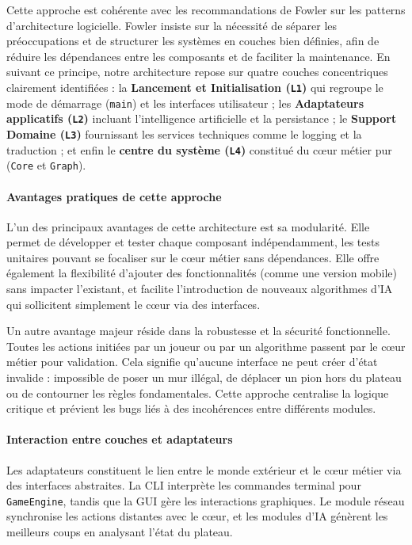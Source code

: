 \documentclass[a4paper]{article}
\begin{document}
Cette approche est cohérente avec les recommandations de Fowler\cite{fowler2002patterns} sur les patterns d’architecture logicielle.
Fowler insiste sur la nécessité de séparer les préoccupations et de structurer les systèmes en couches bien définies, afin de réduire
les dépendances entre les composants et de faciliter la maintenance.
En suivant ce principe, notre architecture repose sur quatre couches concentriques clairement identifiées : la \textbf{Lancement et Initialisation (\texttt{L1})} qui regroupe le mode de démarrage (\texttt{main}) et les interfaces utilisateur ; les \textbf{Adaptateurs applicatifs (\texttt{L2})} incluant l'intelligence artificielle et la persistance ; le \textbf{Support Domaine (\texttt{L3})} fournissant les services techniques comme le logging et la traduction ; et enfin le \textbf{centre du système (\texttt{L4})} constitué du cœur métier pur (\texttt{Core} et \texttt{Graph}).

\paragraph{Avantages pratiques de cette approche}

L’un des principaux avantages de cette architecture est sa modularité. Elle permet de développer et tester chaque composant indépendamment, les tests unitaires pouvant se focaliser sur le cœur métier sans dépendances. Elle offre également la flexibilité d'ajouter des fonctionnalités (comme une version mobile) sans impacter l'existant, et facilite l'introduction de nouveaux algorithmes d'IA qui sollicitent simplement le cœur via des interfaces.

Un autre avantage majeur réside dans la robustesse et la sécurité fonctionnelle. Toutes les actions initiées par un joueur ou par un algorithme passent par le cœur métier pour validation. Cela signifie qu’aucune interface ne peut créer d’état invalide : impossible de poser un mur illégal, de déplacer un pion hors du plateau ou de contourner les règles fondamentales. Cette approche centralise la logique critique et prévient les bugs liés à des incohérences entre différents modules.

\paragraph{Interaction entre couches et adaptateurs}

Les adaptateurs constituent le lien entre le monde extérieur et le cœur métier via des interfaces abstraites. La CLI interprète les commandes terminal pour \texttt{GameEngine}, tandis que la GUI gère les interactions graphiques. Le module réseau synchronise les actions distantes avec le cœur, et les modules d'IA génèrent les meilleurs coups en analysant l'état du plateau.
\end{document}

